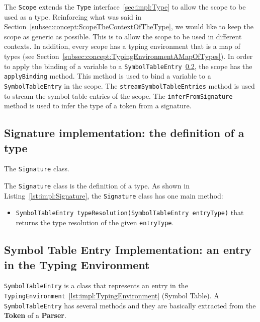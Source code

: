 The \texttt{Scope} extends the \texttt{Type} interface~\ref{sec:impl:Type} to allow the scope to be used as a type. Reinforcing what was said in Section~\ref{subsec:concept:ScopeTheContextOfTheType}, we would like to keep the scope as generic as possible. This is to allow the scope to be used in different contexts. In addition, every scope has a typing environment that is a map of types (see Section~\ref{subsec:concept:TypingEnvironmentAMapOfTypes}).
In order to apply the binding of a variable to a \texttt{SymbolTableEntry}~\ref{subsec:impl:SymbolTableEntry}, the scope has the \texttt{applyBinding} method. This method is used to bind a variable to a \texttt{SymbolTableEntry} in the scope. The \texttt{streamSymbolTableEntries} method is used to stream the symbol table entries of the scope. The \texttt{inferFromSignature} method is used to infer the type of a token from a signature.

\subsection{Signature implementation: the definition of a type}\label{subsec:impl:Signature}

\begin{Listing}[tb]
    \centering
    \caption{The \texttt{Signature} class.}
    \label{lst:impl:Signature}
\end{Listing}

The \texttt{Signature} class is the definition of a type. As shown in Listing~\ref{lst:impl:Signature}, the \texttt{Signature} class has one main method:
\begin{itemize}
    \item \texttt{SymbolTableEntry typeResolution(SymbolTableEntry entryType)} that returns the type resolution of the given \texttt{entryType}.
\end{itemize}

\subsection{Symbol Table Entry Implementation: an entry in the Typing Environment}\label{subsec:impl:SymbolTableEntry}
\texttt{SymbolTableEntry} is a class that represents an entry in the \texttt{TypingEnvironment}~\ref{lst:impl:TypingEnvironment} (Symbol Table).
A \texttt{SymbolTableEntry} has several methods and they are basically extracted from the \textbf{Token} of a \textbf{Parser}.

